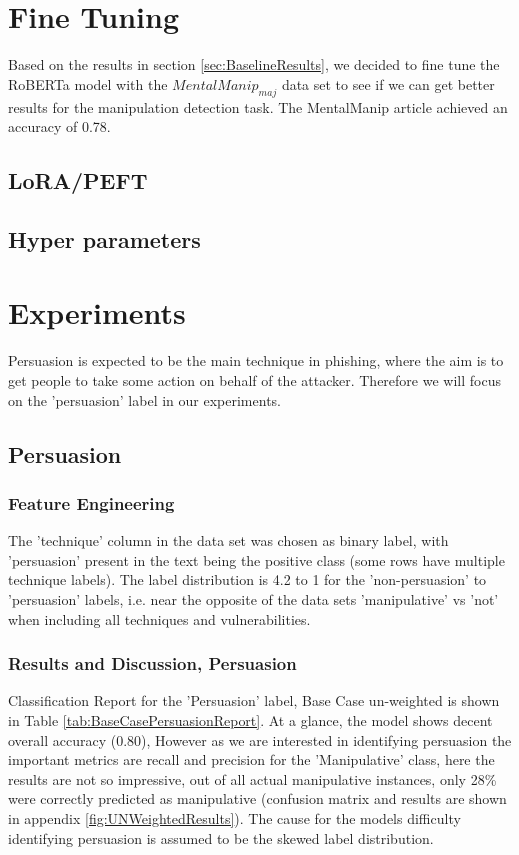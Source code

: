 \documentclass[
	letterpaper, %
	12pt, %
	unnumberedsections, %
	twoside, %
]{LTJournalArticle}
\begin{document}
\section{Fine Tuning}
Based on the results in section \ref{sec:BaselineResults}, we decided to fine tune the RoBERTa model with the $MentalManip_{maj}$ data set to see if we can get better results for the manipulation detection task. The MentalManip article\cite{MentalManip} achieved an accuracy of 0.78.

\subsection{LoRA/PEFT}
\subsection{Hyper parameters}







\section{Experiments}
Persuasion is expected to be the main technique in phishing, where the aim is to get people to take some action on behalf of the attacker. Therefore we will focus on the 'persuasion' label in our experiments.

\subsection{Persuasion}
\subsubsection{Feature Engineering}
The 'technique' column in the data set was chosen as binary label, with 'persuasion' present in the text being the positive class (some rows have multiple technique labels). The label distribution is 4.2 to 1 for the 'non-persuasion' to 'persuasion' labels, i.e. near the opposite of the data sets 'manipulative' vs 'not' when including all techniques and vulnerabilities.

\subsubsection{Results and Discussion, Persuasion}
Classification Report for the 'Persuasion' label, Base Case un-weighted is shown in Table \ref{tab:BaseCasePersuasionReport}. At a glance, the model shows decent overall accuracy (0.80), However as we are interested in identifying persuasion the important metrics are recall and precision for the 'Manipulative' class, here the results are not so impressive, out of all actual manipulative instances, only 28\% were correctly predicted as manipulative (confusion matrix and results are shown in appendix \ref{fig:UNWeightedResults}). The cause for the models difficulty identifying persuasion is assumed to be the skewed label distribution.
\end{document}
